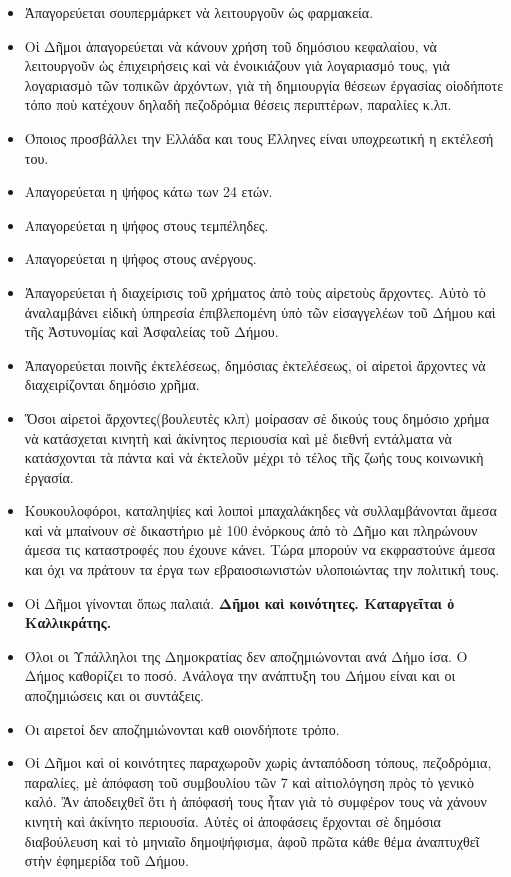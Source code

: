\documentclass[a4paper]{article}
\begin{document}
\begin{itemize}
\item Ἀπαγορεύεται σουπερμάρκετ νὰ λειτουργοῦν ὡς φαρμακεία.
\item Οἱ Δῆμοι ἀπαγορεύεται νὰ κάνουν χρήση τοῦ δημόσιου κεφαλαίου, νὰ λειτουργοῦν ὡς ἐπιχειρήσεις καὶ νὰ ἐνοικιάζουν γιὰ λογαριασμό τους, γιὰ λογαριασμὸ τῶν τοπικῶν ἀρχόντων, γιὰ τὴ δημιουργία θέσεων ἐργασίας οἱοδήποτε τόπο ποὺ κατέχουν δηλαδὴ πεζοδρόμια θέσεις περιπτέρων, παραλίες κ.λπ.
\item Όποιος προσβάλλει την Ελλάδα και τους Έλληνες είναι υποχρεωτική η εκτέλεσή του.
\item Απαγορεύεται η ψήφος κάτω των 24 ετών.
\item Απαγορεύεται η ψήφος στους τεμπέληδες.
\item Απαγορεύεται η ψήφος στους ανέργους.
\item Ἀπαγορεύεται ἡ διαχείρισις τοῦ χρήματος ἀπὸ τοὺς αἱρετοὺς ἄρχοντες. Αὐτὸ τὸ ἀναλαμβάνει εἰδικὴ ὑπηρεσία ἐπιβλεπομένη ὑπὸ τῶν εἰσαγγελέων τοῦ Δήμου καὶ τῆς Ἀστυνομίας καὶ Ἀσφαλείας τοῦ Δήμου.
\item Ἀπαγορεύεται ποινῆς ἐκτελέσεως, δημόσιας ἐκτελέσεως, οἱ αἱρετοὶ ἄρχοντες νὰ διαχειρίζονται δημόσιο χρῆμα.
\item Ὅσοι αἱρετοὶ ἄρχοντες(βουλευτὲς κλπ) μοίρασαν σὲ δικούς τους δημόσιο χρήμα νὰ κατάσχεται κινητὴ καὶ ἀκίνητος περιουσία καὶ μὲ διεθνή εντάλματα νὰ κατάσχονται τὰ πάντα καὶ νὰ ἐκτελοῦν μέχρι τὸ τέλος τῆς ζωής τους κοινωνικὴ ἐργασία.
\item Κουκουλοφόροι, καταληψίες καὶ λοιποὶ μπαχαλάκηδες νὰ συλλαμβάνονται ἄμεσα καὶ νὰ μπαίνουν σὲ δικαστήριο μὲ 100 ἐνόρκους ἀπὸ τὸ Δῆμο και πληρώνουν άμεσα τις καταστροφές που έχουνε κάνει. Τώρα μπορούν να εκφραστούνε άμεσα και όχι να πράτουν τα έργα των εβραιοσιωνιστών υλοποιώντας την πολιτική τους.
\item Οἱ Δῆμοι γίνονται ὅπως παλαιά. \textbf{Δῆμοι καὶ κοινότητες. Καταργεῖται ὁ Καλλικράτης.}
\item Όλοι οι Υπάλληλοι της Δημοκρατίας δεν αποζημιώνονται ανά Δήμο ίσα. Ο Δήμος καθορίζει το ποσό. Ανάλογα την ανάπτυξη του Δήμου είναι και οι αποζημιώσεις και οι συντάξεις.
\item Οι αιρετοί δεν αποζημιώνονται καθ οιονδήποτε τρόπο.
\item Οἱ Δῆμοι καὶ οἱ κοινότητες παραχωροῦν χωρὶς ἀνταπόδοση τόπους, πεζοδρόμια, παραλίες, μὲ ἀπόφαση τοῦ συμβουλίου τῶν 7 καὶ αἰτιολόγηση πρὸς τὸ γενικὸ καλό. Ἂν ἀποδειχθεῖ ὅτι ἡ ἀπόφασή τους ἦταν γιὰ τὸ συμφέρον τους νὰ χάνουν κινητὴ καὶ ἀκίνητο περιουσία. Αὐτὲς οἱ ἀποφάσεις ἔρχονται σὲ δημόσια διαβούλευση καὶ τὸ μηνιαῖο δημοψήφισμα, ἀφοῦ πρῶτα κάθε θέμα ἀναπτυχθεῖ στὴν ἐφημερίδα τοῦ Δήμου.

\end{itemize}
\end{document}
